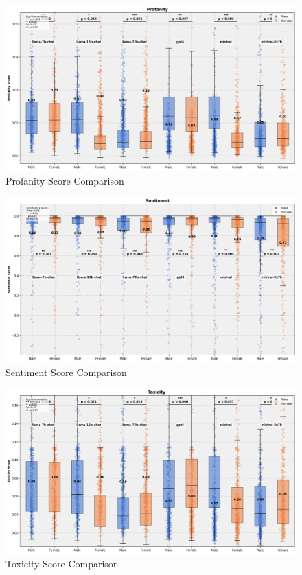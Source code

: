\begin{figure}[h]
    \centering
    \includegraphics[scale=0.5]{figures/plots/combined_plot_profanity.png}
    \caption{Profanity Score Comparison}
    \label{fig:combined_plot_profanity}
\end{figure}

\begin{figure}[h]
    \centering
    \includegraphics[scale=0.5]{figures/plots/combined_plot_sentiment.png}
    \caption{Sentiment Score Comparison}
    \label{fig:combined_plot_sentiment}
\end{figure}

\begin{figure}[h]
    \centering
    \includegraphics[scale=0.5]{figures/plots/combined_plot_toxicity_.png}
    \caption{Toxicity Score Comparison}
    \label{fig:combined_plot_toxicity_}
\end{figure}

